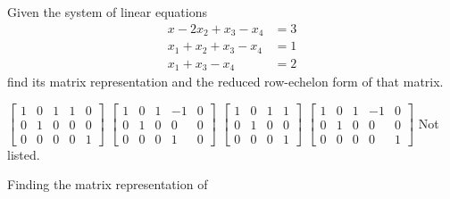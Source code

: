 \begin{questions}
  \question[10] Given the system of linear equations
  \[
    \label{eq:A}
    \tag{$\star$}
    \begin{aligned}
      x-2x_2+x_3-x_4&=3\\
      x_1+x_2+x_3-x_4&=1\\
      x_1+x_3-x_4&=2
    \end{aligned}
  \]
    find its matrix representation and the reduced row-echelon form of that
    matrix.
  \begin{choices}
    \choice $\left[
      \begin{smallmatrix}
        1&0&1&1&0\\0&1&0&0&0\\0&0&0&0&1
      \end{smallmatrix}
    \right]$%
    \choice $\left[
      \begin{smallmatrix}
        1&0&1&-1&0\\0&1&0&0&0\\0&0&0&1&0
      \end{smallmatrix}
    \right]$%
    \choice $\left[
      \begin{smallmatrix}
        1&0&1&1\\0&1&0&0\\0&0&0&1
      \end{smallmatrix}
    \right]$%
    \choice $\left[
      \begin{smallmatrix}
        1&0&1&-1&0\\0&1&0&0&0\\0&0&0&0&1
      \end{smallmatrix}
    \right]$%
    \choice Not listed.
  \end{choices}
  \begin{solution}
    Finding the matrix representation of
  \end{solution}


\end{questions}
